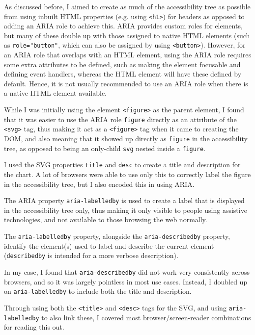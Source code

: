 \documentclass[ %
                    author={Aleena Baig},
                supervisor={Dr Simon Lock},
                    degree={BSc},
                     title={On Making Web Accessible Graphs},
                  subtitle={},
                      year={2019} ]{dissertation}
\begin{document}
As discussed before, I aimed to create as much of the accessibility tree as possible from using inbuilt HTML properties (e.g. using \texttt{<h1>}) for headers as opposed to adding an ARIA role to achieve this. ARIA provides custom roles for elements, but many of these double up with those assigned to native HTML elements (such as \texttt{role="button"}, which can also be assigned by using \texttt{<button>}). However, for an ARIA role that overlaps with an HTML element, using the ARIA role requires some extra attributes to be defined, such as making the element focusable and defining event handlers, whereas the HTML element will have these defined by default. Hence, it is not usually recommended to use an ARIA role when there is a native HTML element available.

While I was initially using the element \texttt{<figure>} as the parent element, I found that it was easier to use the ARIA role \texttt{figure} directly as an attribute of the \texttt{<svg>} tag, thus making it act as a \texttt{<figure>} tag when it came to creating the DOM, and also meaning that it showed up directly as \texttt{figure} in the accessibility tree, as opposed to being an only-child \texttt{svg} nested inside a \texttt{figure}.

I used the SVG properties \texttt{title} and \texttt{desc} to create a title and description for the chart. A lot of browsers were able to use only this to correctly label the figure in the accessibility tree, but I also encoded this in using ARIA.

The ARIA property \texttt{aria-labelledby} is used to create a label that is displayed in the accessibility tree only, thus making it only visible to people using assistive technologies, and not available to those browsing the web normally.

The \texttt{aria-labelledby} property, alongside the \texttt{aria-describedby} property, identify the element(s) used to label and describe the current element (\texttt{describedby} is intended for a more verbose description).

In my case, I found that \texttt{aria-describedby} did not work very consistently across browsers, and so it was largely pointless in most use cases. Instead, I doubled up on \texttt{aria-labelledby} to include both the title and description.

Through using both the \texttt{<title>} and \texttt{<desc>} tags for the SVG, and using \texttt{aria-labelledby} to also link these, I covered most browser/screen-reader combinations for reading this out.
\end{document}
